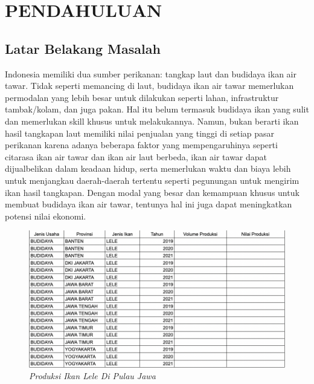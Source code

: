 
\chapter{PENDAHULUAN}

\section{Latar Belakang Masalah}

Indonesia memiliki dua sumber perikanan: tangkap laut dan budidaya ikan air tawar. Tidak seperti memancing di laut, budidaya ikan air tawar memerlukan permodalan yang lebih besar untuk dilakukan seperti lahan, infrastruktur tambak/kolam, dan juga pakan. Hal itu belum termasuk budidaya ikan yang sulit dan memerlukan skill khusus untuk melakukannya. Namun, bukan berarti ikan hasil tangkapan laut memiliki nilai penjualan yang tinggi di setiap pasar perikanan karena adanya beberapa faktor yang mempengaruhinya seperti citarasa ikan air tawar dan ikan air laut berbeda, ikan air tawar dapat dijualbelikan dalam keadaan hidup, serta memerlukan waktu dan biaya lebih untuk menjangkau daerah-daerah tertentu seperti pegunungan untuk mengirim ikan hasil tangkapan. Dengan modal yang besar dan kemampuan khusus untuk membuat budidaya ikan air tawar, tentunya hal ini juga dapat meningkatkan potensi nilai ekonomi.

\begin{figure}[H]
	\centering
	\includegraphics[keepaspectratio, width=12cm]{gambar/budidaya-ikan-lele-jawa.png}
	\caption{\emph{Produksi Ikan Lele Di Pulau Jawa} \citep{kkpdatajawa}}
	\label{gambar:budidaya-ikan-lele-jawa}
\end{figure}

